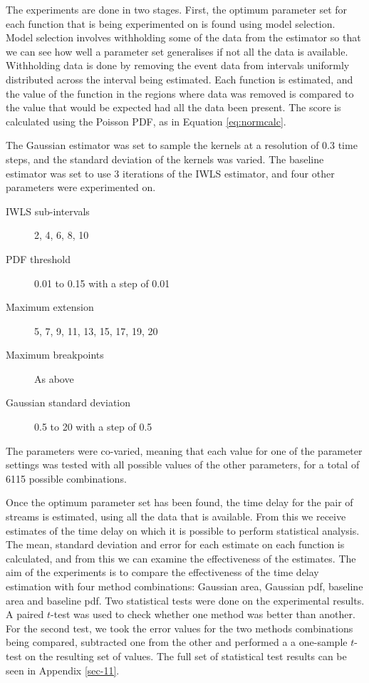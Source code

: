 \documentclass[a4paper,11pt]{article}
\begin{document}
  The experiments are done in two stages. First, the optimum parameter set for
  each function that is being experimented on is found using model
  selection. Model selection involves withholding some of the data from the
  estimator so that we can see how well a parameter set generalises if not all
  the data is available. Withholding data is done by removing the event data
  from intervals uniformly distributed across the interval being estimated. Each
  function is estimated, and the value of the function in the regions where data
  was removed is compared to the value that would be expected had all the data
  been present. The score is calculated using the Poisson PDF, as in Equation
  \eqref{eq:normcalc}.

  The Gaussian estimator was set to sample the kernels at a resolution of 0.3 time
  steps, and the standard deviation of the kernels was varied. The baseline
  estimator was set to use 3 iterations of the IWLS estimator, and four other
  parameters were experimented on.
  \begin{description}
  \item[IWLS sub-intervals] 2, 4, 6, 8, 10
  \item[PDF threshold] 0.01 to 0.15 with a step of 0.01
  \item[Maximum extension] 5, 7, 9, 11, 13, 15, 17, 19, 20
  \item[Maximum breakpoints] As above
  \item[Gaussian standard deviation] 0.5 to 20 with a step of 0.5
  \end{description}
  The parameters were co-varied, meaning that each value for one
  of the parameter settings was tested with all possible values of the other
  parameters, for a total of 6115 possible combinations.

  Once the optimum parameter set has been found, the time delay for the pair of
  streams is estimated, using all the data that is available. From this we
  receive estimates of the time delay on which it is possible to perform
  statistical analysis. The mean, standard deviation and error for each estimate
  on each function is calculated, and from this we can examine the effectiveness
  of the estimates. The aim of the experiments is to compare the effectiveness
  of the time delay estimation with four method combinations: Gaussian area,
  Gaussian pdf, baseline area and baseline pdf. Two statistical tests were done
  on the experimental results. A paired $t$-test was used to check whether one
  method was better than another. For the second test, we took the error values
  for the two methods combinations being compared, subtracted one from the other
  and performed a a one-sample $t$-test on the resulting set of values. The full
  set of statistical test results can be seen in Appendix \ref{sec-11}.
\end{document}
